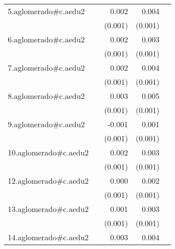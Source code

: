 {\begin{longtable}{l*{4}{D{.}{.}{-1}}}
\addlinespace
5.aglomerado#c.aedu2&                     &       0.002         &       0.004\sym{***}&                     \\
            &                     &     (0.001)         &     (0.001)         &                     \\
\addlinespace
6.aglomerado#c.aedu2&                     &       0.002         &       0.003\sym{***}&                     \\
            &                     &     (0.001)         &     (0.001)         &                     \\
\addlinespace
7.aglomerado#c.aedu2&                     &       0.002         &       0.004\sym{***}&                     \\
            &                     &     (0.001)         &     (0.001)         &                     \\
\addlinespace
8.aglomerado#c.aedu2&                     &       0.003\sym{**} &       0.005\sym{***}&                     \\
            &                     &     (0.001)         &     (0.001)         &                     \\
\addlinespace
9.aglomerado#c.aedu2&                     &      -0.001         &       0.001         &                     \\
            &                     &     (0.001)         &     (0.001)         &                     \\
\addlinespace
10.aglomerado#c.aedu2&                     &       0.002         &       0.003\sym{***}&                     \\
            &                     &     (0.001)         &     (0.001)         &                     \\
\addlinespace
12.aglomerado#c.aedu2&                     &       0.000         &       0.002\sym{*}  &                     \\
            &                     &     (0.001)         &     (0.001)         &                     \\
\addlinespace
13.aglomerado#c.aedu2&                     &       0.001         &       0.003\sym{***}&                     \\
            &                     &     (0.001)         &     (0.001)         &                     \\
\addlinespace
14.aglomerado#c.aedu2&                     &       0.003\sym{*}  &       0.004\sym{***}&                     \\

\end{longtable}}
